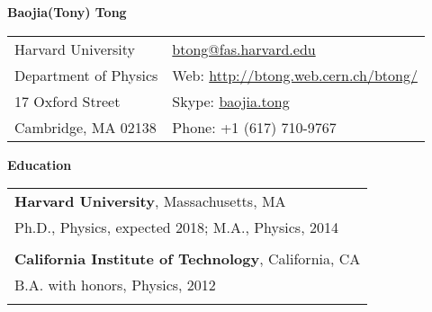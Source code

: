 \documentclass[letterpaper,11pt,oneside]{article}
\newcommand*{\Skype}{\href{skype:baojia.tong?add}{baojia.tong}}
\newcommand{\Absender}[1][\normalsize]{\Skype}
\newcommand{\blue}[1]{\textcolor[rgb]{0,0,0.9}{#1}}
\begin{document}
\noindent  \center \LARGE{\textbf{Baojia(Tony) Tong}}  \\
\vspace{1cm}
\normalsize
\begin{center}
\begin{tabular}{l l}
 Harvard University           & \hspace{1.25in} \href{mailto:btong@fas.harvard.edu}{btong@fas.harvard.edu} \\
 Department of Physics    & \hspace{1.25in} Web: \blue{\href{http://btong.web.cern.ch/btong/}{http://btong.web.cern.ch/btong/}}   \\
 17 Oxford Street              & \hspace{1.25in} Skype: \Absender  \\
 Cambridge, MA 02138     & \hspace{1.25in} Phone: +1 (617) 710-9767 \\
\end{tabular}
\end{center}
\noindent\makebox[\linewidth]{\rule{0.8\paperwidth}{1.5pt}}
\raggedright
\normalsize
\begin{flushleft}
\textbf{\Large{Education}} \\
\vspace{0.5cm}
 \begin{tabular}{@{} l}
     \textbf{Harvard University}, Massachusetts, MA \\
     Ph.D., Physics, expected 2018; M.A., Physics, 2014 \\
     \\
     \textbf{California Institute of Technology}, California, CA \\
     B.A. with honors, Physics, 2012 \\
     \\
 \end{tabular}
\end{flushleft}
\end{document}
